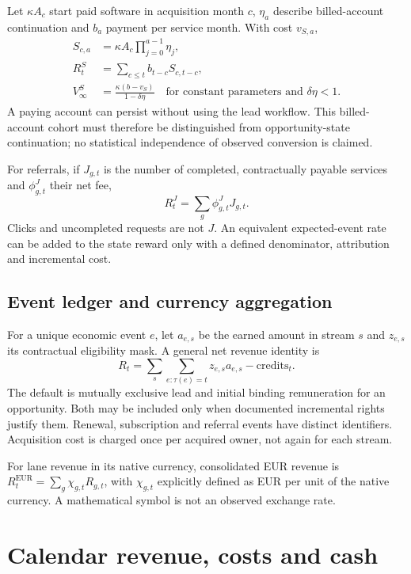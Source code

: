 \documentclass[11pt,a4paper]{article}
\begin{document}
Let $\kappa A_c$ start paid software in acquisition month $c$, $\eta_a$ describe billed-account continuation and $b_a$ payment per service month. With cost $v_{S,a}$,
\begin{align}
 S_{c,a}&=\kappa A_c\prod_{j=0}^{a-1}\eta_j,\\
 R_t^{S}&=\sum_{c\leq t}b_{t-c}S_{c,t-c},\\
 V_\infty^{S}&=\frac{\kappa(b-v_S)}{1-\delta\eta}
 \quad\text{for constant parameters and }\delta\eta<1.
\end{align}
A paying account can persist without using the lead workflow. This billed-account cohort must therefore be distinguished from opportunity-state continuation; no statistical independence of observed conversion is claimed.

For referrals, if $J_{g,t}$ is the number of completed, contractually payable services and $\phi^J_{g,t}$ their net fee,
\begin{equation}
 R_t^{J}=\sum_g\phi^J_{g,t}J_{g,t}.
\end{equation}
Clicks and uncompleted requests are not $J$. An equivalent expected-event rate can be added to the state reward only with a defined denominator, attribution and incremental cost.

\subsection{Event ledger and currency aggregation}

For a unique economic event $e$, let $a_{e,s}$ be the earned amount in stream $s$ and $z_{e,s}$ its contractual eligibility mask. A general net revenue identity is
\begin{equation}
 R_t=\sum_{s}\sum_{e:\tau(e)=t}z_{e,s}a_{e,s}-\mathrm{credits}_t.
\end{equation}
The default is mutually exclusive lead and initial binding remuneration for an opportunity. Both may be included only when documented incremental rights justify them. Renewal, subscription and referral events have distinct identifiers. Acquisition cost is charged once per acquired owner, not again for each stream.

For lane revenue in its native currency, consolidated EUR revenue is $R_t^{\mathrm{EUR}}=\sum_g\chi_{g,t}R_{g,t}$, with $\chi_{g,t}$ explicitly defined as EUR per unit of the native currency. A mathematical symbol is not an observed exchange rate.

\section{Calendar revenue, costs and cash}
\end{document}
